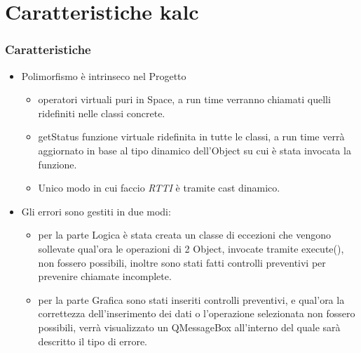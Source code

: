\documentclass[10pt]{beamer}
\begin{document}
\section{Caratteristiche kalc}
\begin{frame}
\frametitle{Caratteristiche}
\begin{itemize}
\item Polimorfismo è intrinseco nel Progetto
\begin{itemize}
\item operatori virtuali puri in Space, a run time verranno chiamati quelli ridefiniti nelle classi concrete.
\item getStatus funzione virtuale ridefinita in tutte le classi, a run time verrà aggiornato in base al tipo dinamico dell'Object su cui è stata invocata la funzione.
\item Unico modo in cui faccio \textit{RTTI} è tramite cast dinamico.

\end{itemize}

\item Gli errori sono gestiti in due modi:
\begin{itemize}
\item per la parte Logica è stata creata un classe di eccezioni che vengono sollevate qual'ora le operazioni di 2 Object, invocate tramite execute(), non fossero possibili, inoltre sono stati fatti controlli preventivi per prevenire chiamate incomplete.
\item per la parte Grafica sono stati inseriti controlli preventivi, e qual'ora la correttezza dell'inserimento dei dati o l'operazione selezionata non fossero possibili, verrà visualizzato un QMessageBox all'interno del quale sarà descritto il tipo di errore. 

\end{itemize}

\end{itemize}
\end{frame}

\end{document}
